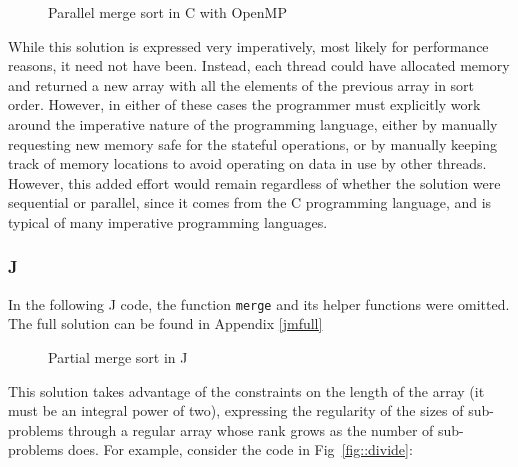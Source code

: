 \begin{figure}[h]
\begin{quote}
\begin{singlespacing}
\begin{small}
\end{small}
\end{singlespacing}
\end{quote}
\caption{Parallel merge sort in C with OpenMP}
\label{fig::mergeSort-omp.c}
\end{figure}

While this solution is expressed very imperatively, most likely for performance reasons, it need not have been. 
Instead, each thread could have allocated memory and returned a new array with all the elements of the previous array in sort order.
However, in either of these cases the programmer must explicitly work around the 
imperative nature of the programming language, either by manually requesting new memory safe for the stateful operations, 
or by manually keeping track of memory locations to avoid operating on data in use by other threads.
However, this added effort would remain regardless of whether the solution were sequential or parallel, 
since it comes from the C programming language, and is typical of many imperative programming languages.

\subsubsection{J}
\label{jmerge}
In the following J code, the function \texttt{merge} and its helper functions were omitted.
The full solution can be found in Appendix \ref{jmfull}

\begin{figure}[ht]
\begin{quote}
\begin{singlespacing}
\begin{small}
\end{small}
\end{singlespacing}
\end{quote}
\caption{Partial merge sort in J}
\label{fig::mergeSort.ijs}
\end{figure}

This solution takes advantage of the constraints on the length of the array (it must be an integral power of two), 
expressing the regularity of the sizes of sub-problems through a regular array 
whose rank grows as the number of sub-problems does.
For example, consider the code in Fig~\ref{fig::divide}: 

